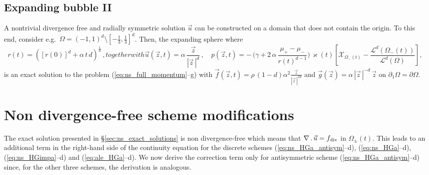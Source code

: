 \documentclass[a4paper,12pt,onecolumn]{article}
\newcommand{\vol}{\mathcal{L}^d}
\newcommand{\bigchi}{\ensuremath{\mathrm{\mathcal{X}}}}
\newcommand{\charfcn}[1]{\bigchi_{#1}} %
\begin{document}
\subsection{Expanding bubble II}\label{sec:exp2}
A nontrivial divergence free and radially symmetric solution $\vec u$
can be constructed on a domain that does not contain the origin. To this end,
consider e.g.\ $\Omega = (-1,1)^d \setminus [-\frac13, \frac13]^d$. Then, the
expanding sphere where
\begin{subequations}
\begin{equation} \label{eq:ns_sol_3_r}
r(t) = ([r(0)]^d + \alpha\,t\,d)^\frac1d \,,
\end{equation}
together with
\begin{equation} \label{eq:ns_sol_3_up}
\vec u(\vec z, t) = \alpha\,\frac{\vec z}{|\vec z\,|^d}\,, \quad
p(\vec z, t) = -\,\bigg(\gamma +2\,\alpha\,\frac{\mu_+ - \mu_-}
{r(t)^{d-1}}\bigg)\,\varkappa(t)\left[ \charfcn{\Omega_-(t)} -
\frac{\vol(\Omega_-(t))}{\vol(\Omega)}\right],
\end{equation}
\end{subequations}
is an exact solution to the problem (\ref{eq:ns_full_momentum}--g) with
$\vec f(\vec z, t) = \rho\,(1-d)\alpha^2\frac{\vec z}{|\vec z\,|^{2d}}$ and
$\vec g(\vec z) = \alpha\,|\vec z\,|^{-d}\,\vec z$ on
$\partial_1\Omega=\partial\Omega$.

\section{Non divergence-free scheme modifications}\label{sec:ns_non_div_free}
The exact solution presented in \S\ref{sec:ns_exact_solutions} is non
divergence-free which means that $\nabla\,.\,\vec u = f_{\rm{div}}$ in
$\Omega_\pm(t)$. This leads to an additional term in the right-hand side of the
continuity equation for the discrete schemes (\ref{eq:ns_HGa_antisym}--d),
(\ref{eq:ns_HGa}--d), (\ref{eq:ns_HGimpa}--d) and (\ref{eq:ale_HGa}--d). We
now derive the correction term only for antisymmetric scheme
(\ref{eq:ns_HGa_antisym}--d) since, for the other three schemes, the
derivation is analogous.
\end{document}
